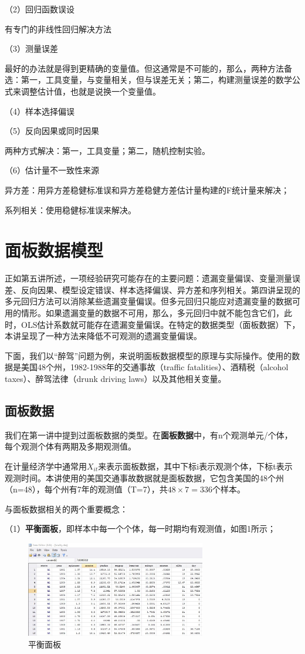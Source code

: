 \documentclass[cn,10pt,math=newtx,citestyle=gb7714-2015,bibstyle=gb7714-2015]{elegantbook}
\begin{document}
（2）回归函数误设

有专门的非线性回归解决方法

（3）测量误差

最好的办法就是得到更精确的变量值。但这通常是不可能的，那么，两种方法备选：第一，工具变量，与变量相关，但与误差无关；第二，构建测量误差的数学公式来调整估计值，也就是说换一个变量值。

（4）样本选择偏误

（5）反向因果或同时因果

两种方式解决：第一，工具变量；第二，随机控制实验。

（6）估计量不一致性来源

异方差：用异方差稳健标准误和异方差稳健方差估计量构建的F统计量来解决；

系列相关：使用稳健标准误来解决。

\chapter{面板数据模型}

正如第五讲所述，一项经验研究可能存在的主要问题：遗漏变量偏误、变量测量误差、反向因果、模型设定错误、样本选择偏误、异方差和序列相关。第四讲呈现的多元回归方法可以消除某些遗漏变量偏误。但多元回归只能应对遗漏变量的数据可用的情形。如果遗漏变量的数据不可用，那么，多元回归中就不能包含它们，此时，OLS估计系数就可能存在遗漏变量偏误。在特定的数据类型（面板数据）下，本讲呈现了一种方法来降低不可观测的遗漏变量偏误。

下面，我们以“醉驾”问题为例，来说明面板数据模型的原理与实际操作。使用的数据是美国48个州，1982-1988年的交通事故（traffic fatalities）、酒精税（alcohol taxes）、醉驾法律（drunk driving laws）以及其他相关变量。


\section{面板数据}
我们在第一讲中提到过面板数据的类型。在\textbf{面板数据}中，有n个观测单元/个体，每个观测个体有两期及多期观测值。

在计量经济学中通常用$X_{it}$来表示面板数据，其中下标i表示观测个体，下标t表示观测时间。本讲使用的美国交通事故数据就是面板数据，它包含美国的48个州（n=48），每个州有7年的观测值（T=7），共$48\times7=336$个样本。

与面板数据相关的两个重要概念：

（1）\textbf{平衡面板}，即样本中每一个个体，每一时期均有观测值，如图1所示；

\begin{figure}[htbp]
	\centering
	\includegraphics[width=0.7\textwidth]{balancedpanel.jpg}
	\caption{平衡面板}\label{fig:digit}
\end{figure}
\end{document}
